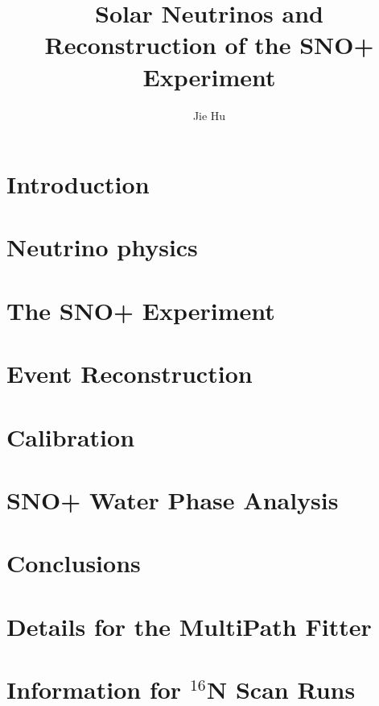 \documentclass[phd,black]{PrincetonThesis}
\title{Solar Neutrinos and Reconstruction of the SNO+ Experiment}
\author{Jie Hu}
\begin{document}
\begin{frontmatter}
  
  \begin{thesisabstract}
    
  \end{thesisabstract}
  
  \begin{acknowledgements}
    
  \end{acknowledgements}
  
\end{frontmatter}

\cleardoublepage
\chapter{Introduction}

\chapter{Neutrino physics}

\chapter{The SNO+ Experiment}

\chapter{Event Reconstruction}

\chapter{Calibration}

\chapter{SNO+ Water Phase Analysis}

\chapter{Conclusions}


\appendix

\cleardoublepage
\chapter{Details for the MultiPath Fitter}

\chapter{Information for $^{16}$N Scan Runs}

	\cleardoublepage
	\nocite{*} %
	
	
\end{document}
